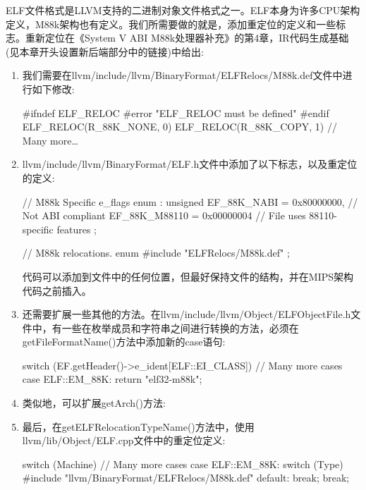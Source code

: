 ELF文件格式是LLVM支持的二进制对象文件格式之一。ELF本身为许多CPU架构定义，M88k架构也有定义。我们所需要做的就是，添加重定位的定义和一些标志。重新定位在《System V ABI M88k处理器补充》的第4章，IR代码生成基础(见本章开头设置新后端部分中的链接)中给出:

\begin{enumerate}
\item
我们需要在llvm/include/llvm/BinaryFormat/ELFRelocs/M88k.def文件中进行如下修改:

\begin{cpp}
#ifndef ELF_RELOC
#error "ELF_RELOC must be defined"
#endif
ELF_RELOC(R_88K_NONE, 0)
ELF_RELOC(R_88K_COPY, 1)
// Many more…
\end{cpp}

\item
llvm/include/llvm/BinaryFormat/ELF.h文件中添加了以下标志，以及重定位的定义:

\begin{cpp}
// M88k Specific e_flags
enum : unsigned {
    EF_88K_NABI = 0x80000000, // Not ABI compliant
    EF_88K_M88110 = 0x00000004 // File uses 88110-specific
    features
};

// M88k relocations.
enum {
    #include "ELFRelocs/M88k.def"
};
\end{cpp}

代码可以添加到文件中的任何位置，但最好保持文件的结构，并在MIPS架构代码之前插入。

\item
还需要扩展一些其他的方法。在llvm/include/llvm/Object/ELFObjectFile.h文件中，有一些在枚举成员和字符串之间进行转换的方法，必须在getFileFormatName()方法中添加新的case语句:

\begin{cpp}
switch (EF.getHeader()->e_ident[ELF::EI_CLASS]) {
    // Many more cases
    case ELF::EM_88K:
    return "elf32-m88k";
}
\end{cpp}

\item
类似地，可以扩展getArch()方法:

\begin{cpp}
switch (EF.getHeader().e_machine) {
    // Many more cases
    case ELF::EM_88K:
    return Triple::m88k;
\end{cpp}

\item
最后，在getELFRelocationTypeName()方法中，使用llvm/lib/Object/ELF.cpp文件中的重定位定义:

\begin{cpp}
switch (Machine) {
    // Many more cases
    case ELF::EM_88K:
    switch (Type) {
        #include "llvm/BinaryFormat/ELFRelocs/M88k.def"
        default:
        break;
    }
    break;
}
\end{cpp}


\end{enumerate}
